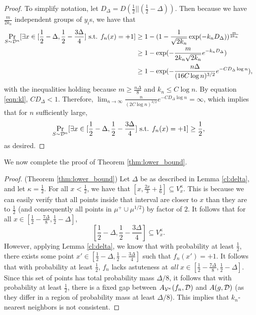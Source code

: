 \begin{proof}
To simplify notation, let $D_\Delta = D(\frac{1}{2}||(\frac{1}{2} - \Delta))$. Then because we have $\frac{m}{2k_n}$ independent groups of $y_i$s, we have that
\begin{equation*}
\begin{split}
\Pr_{S \sim {\mathcal D}^n}[\exists x \in [\frac{1}{2} - \Delta, \frac{1}{2} - \frac{3\Delta}{4}]\text{ s.t. }f_n(x) = +1] &\geq 1 - (1 - \frac{1}{\sqrt{2k_n}}\exp(-k_nD_\Delta))^{\frac{m}{2k_n}} \\
&\geq 1 - \exp(-\frac{m}{2k_n\sqrt{2k_n}}e^{-k_nD_\Delta}) \\
&\geq 1 - \exp(-\frac{n\Delta}{(16C\log n)^{3/2}}e^{-CD_\Delta\log n}),
\end{split}
\end{equation*}
with the inequalities holding because $m \geq \frac{n\Delta}{8}$ and $k_n \leq C \log n$. By equation \ref{eqn:kl}, $CD_\Delta < 1$. Therefore, $\lim_{n \to \infty} \frac{n}{(2C \log n)^{3/2}}e^{-CD_\Delta\log n} = \infty$, which implies that for $n$ sufficiently large, $$\Pr_{S \sim {\mathcal D}^n}[\exists x \in [\frac{1}{2} - \Delta, \frac{1}{2} - \frac{3\Delta}{4}]\text{ s.t. }f_n(x) = +1] \geq \frac{1}{2},$$ as desired.
\end{proof}

We now complete the proof of Theorem \ref{thm:lower_bound}.

\begin{proof}
(Theorem \ref{thm:lower_bound}) Let $\Delta$ be as described in Lemma \ref{cl:delta}, and let $\kappa = \frac{1}{2}$. For all $x < \frac{1}{2}$, we have that $[x, \frac{2x}{3} + \frac{1}{6}] \subseteq V_x^{\kappa}$. This is because we can easily verify that all points inside that interval are closer to $x$ than they are to $\frac{1}{2}$ (and consequently all points in $\mu^+ \cup \mu^{1/2}$) by factor of $2$. It follows that for all $x \in [\frac{1}{2} - \frac{7\Delta}{8}, \frac{1}{2} - \Delta]$, $$[\frac{1}{2} - \Delta, \frac{1}{2} - \frac{3\Delta}{4}] \subseteq V_x^{\kappa}.$$ However, applying Lemma \ref{cl:delta}, we know that with probability at least $\frac{1}{2}$, there exists some point $x' \in [\frac{1}{2} - \Delta, \frac{1}{2} - \frac{3\Delta}{4}]$ such that $f_n(x') = +1$. It follows that with probability at least $\frac{1}{2}$, $f_n$ lacks astuteness at \textit{all} $x \in [\frac{1}{2} - \frac{7\Delta}{8}, \frac{1}{2} - \Delta]$. Since this set of points has total probability mass $\Delta/8$, it follows that with probability at least $\frac{1}{2}$, there is a fixed gap between $A_{{\mathcal V}^\kappa}(f_n, {\mathcal D})$ and $A(g, {\mathcal D})$ (as they differ in a region of probability mass at least $\Delta/8$). This implies that $k_n$-nearest neighbors is not \ncons\emph{ }consistent. 
\end{proof}

